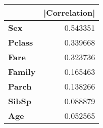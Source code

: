 \begin{tabular}{lr}
\toprule
 & |Correlation| \\
\midrule
\textbf{Sex} & 0.543351 \\
\textbf{Pclass} & 0.339668 \\
\textbf{Fare} & 0.323736 \\
\textbf{Family} & 0.165463 \\
\textbf{Parch} & 0.138266 \\
\textbf{SibSp} & 0.088879 \\
\textbf{Age} & 0.052565 \\
\bottomrule
\end{tabular}
